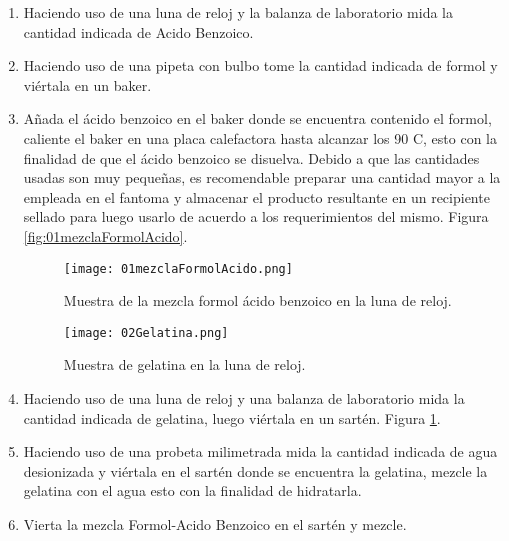 \begin{enumerate}

\item Haciendo uso de una luna de reloj y la balanza de laboratorio mida la cantidad indicada de Acido Benzoico.

\item Haciendo uso de una pipeta con bulbo tome la cantidad indicada de formol y viértala en un baker.

\item Añada el ácido benzoico en el baker donde se encuentra contenido el formol, caliente el baker en una placa calefactora hasta alcanzar los 90 \degree C, esto con la finalidad de que el ácido benzoico se disuelva. Debido a que las cantidades usadas son muy pequeñas, es recomendable preparar una cantidad mayor a la empleada en el fantoma y almacenar el producto resultante en un recipiente sellado para luego usarlo de acuerdo a los requerimientos del mismo. Figura \ref{fig:01mezclaFormolAcido}.

    \begin{figure}[H]
    \centering
    \begin{minipage}{0.45\textwidth}
        \centering
        \texttt{[image: 01mezclaFormolAcido.png]} 
        \caption{Muestra de la mezcla formol ácido benzoico en la luna de reloj.}
        \label{fig:01mezclaFormolAcido}
    \end{minipage}\hfill
    \begin{minipage}{0.45\textwidth}
        \centering
        \texttt{[image: 02Gelatina.png]}
        \caption{Muestra de gelatina en la luna de reloj.}
        \label{fig:02Gelatina}
    \end{minipage}
    \end{figure}

\item Haciendo uso de una luna de reloj y una balanza de laboratorio mida la cantidad indicada de gelatina, luego viértala en un sartén. Figura \ref{fig:02Gelatina}.

\item Haciendo uso de una probeta milimetrada mida la cantidad indicada de agua desionizada y viértala en el sartén donde se encuentra la gelatina, mezcle la gelatina con el agua esto con la finalidad de hidratarla.

\item Vierta la mezcla Formol-Acido Benzoico en el sartén y mezcle.


\end{enumerate}
